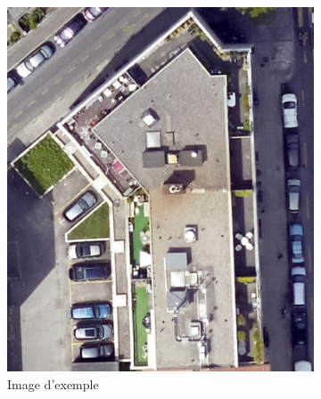 \begin{figure}[H]
    \centering
    
    \begin{subfigure}[b]{0.475\textwidth}
        \centering
        \includegraphics[width=\textwidth]{02-main/figures/ch3_piste_exploree_classification_07_resultats_image_exemple.png}
        \caption{Image d'exemple}
        \label{fig:ch3_piste_exploree_classification_07_resultats_image_exemple}
    \end{subfigure}
    \hfill
    \begin{subfigure}[b]{0.48\textwidth}
        \centering

\end{subfigure}
\end{figure}
